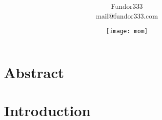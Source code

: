 \documentclass[a4paper]{article}
\title{\center{\texttt{[image: logo]}}\\ \texttitle}
\author{\normalsize Fundor333\\ mail@fundor333.com }
\date{\texttt{[image: mom]}}
\begin{document}
\pagestyle{generic}

\maketitle
\noindent{\color[HTML]{8d0801} \rule{\textwidth}{1pt}}

\section{Abstract}

\lipsum[1-4]\autocite{tanenbaum2013fondamenti}

\section{Introduction}

\lipsum[5-12]

\printbibliography
\end{document}
